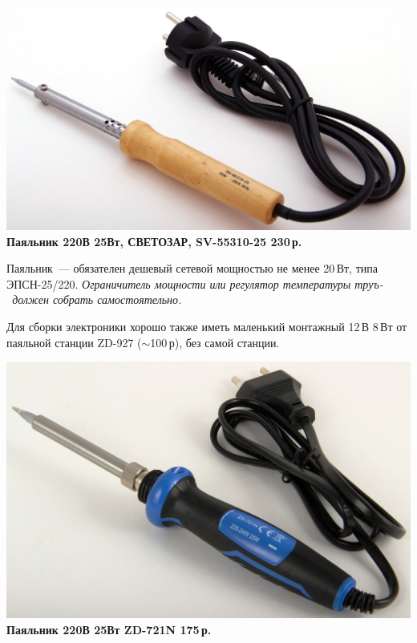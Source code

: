 {\begin{multicols}{2}
\columnbreak

\noindent\href{http://voltmaster-samara.ru/catalog/product/00067650/}{
\includegraphics[width=\columnwidth]{00/fig/SV-55310-25.jpg}}
\textbf{Паяльник 220В 25Вт, СВЕТОЗАР, SV-55310-25 230\,р.}
\end{multicols}

Паяльник\ --- обязателен дешевый сетевой мощностью не менее 20\,Вт, типа
ЭПСН-25/220. \emph{Ограничитель мощности или регулятор температуры труъ-\scr\
должен собрать самостоятельно.}

Для сборки электроники хорошо также иметь маленький монтажный 12\,В 8\,Вт от
паяльной станции ZD-927 ($\sim$100\,р), без самой станции.

\begin{multicols}{2}
\noindent\href{http://voltmaster-samara.ru/catalog/product/00091478/}{
\includegraphics[width=\columnwidth]{00/fig/ZD-721N.jpg}}
\textbf{Паяльник 220В 25Вт ZD-721N 175\,р.}

\columnbreak


\end{multicols}}

